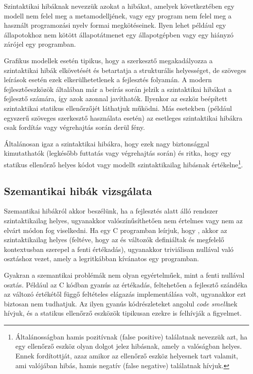 Szintaktikai hibáknak nevezzük azokat a hibákat, amelyek következtében egy modell nem felel meg a metamodelljének, vagy egy program nem felel meg a használt programozási nyelv formai megkötéseinek. Ilyen lehet például egy állapotokhoz nem kötött állapotátmenet egy állapotgépben vagy egy hiányzó zárójel egy programban.

Grafikus modellek esetén tipikus, hogy a szerkesztő megakadályozza a szintaktikai hibák elkövetését és betartatja a strukturális helyességet, de szöveges leírások esetén ezek elkerülhetetlenek a fejlesztés folyamán. A modern fejlesztőeszközök általában már a beírás során jelzik a szintaktikai hibákat a fejlesztő számára, így azok azonnal javíthatók. Ilyenkor az eszköz beépített szintaktikai statikus ellenőrzőjét láthatjuk működni. Más esetekben (például egyszerű szöveges szerkesztő használata esetén) az esetleges szintaktikai hibákra csak fordítás vagy végrehajtás során derül fény.

Általánosan igaz a szintaktikai hibákra, hogy ezek nagy biztonsággal kimutathatók (legkésőbb futtatás vagy végrehajtás során) és ritka, hogy egy statikus ellenőrző helyes kódot vagy modellt szintaktikailag hibásnak értékelne\footnote{Általánosságban hamis pozitívnak (false positive) találatnak nevezzük azt, ha egy ellenőrző eszköz olyan dolgot jelez hibásnak, amely a valóságban helyes. Ennek fordítottját, azaz amikor az ellenőrző eszköz helyesnek tart valamit, ami valójában hibás, hamis negatív (false negative) találatnak hívjuk.\kiegeszitoanyag}.

\subsection{Szemantikai hibák vizsgálata}\label{sec:statikus-ellenorzes-szemantikai-hibak}

Szemantikai hibákról akkor beszélünk, ha a fejlesztés alatt álló rendszer szintaktikailag helyes, ugyanakkor valószínűsíthetően nem értelmes vagy nem az elvárt módon fog viselkedni. Ha egy C programban leírjuk, hogy , akkor az szintaktikailag helyes (feltéve, hogy az  és  változók definiáltak és megfelelő kontextusban szerepel a fenti értékadás), ugyanakkor triviálisan nullával való osztáshoz vezet, amely a legritkábban kívánatos egy programban. 

Gyakran a szemantikai problémák nem olyan egyértelműek, mint a fenti nullával osztás. Például az  C kódban gyanús az értékadás, feltehetően a fejlesztő szándéka az  változó értékétől függő feltételes elágazás implementálása volt, ugyanakkor ezt biztosan nem tudhatjuk. Az ilyen gyanús kódrészleteket angolul \emph{code smell}nek hívjuk, és a statikus ellenőrző eszközök tipikusan ezekre is felhívják a figyelmet.

